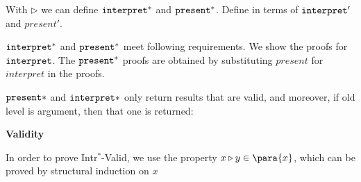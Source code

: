 With $\triangleright$ we can define ${\tt interpret}^*$ and ${\tt present}^*$. Define in terms of ${\tt interpret}'$ and $present'$. 


${\tt interpret}^*$ and ${\tt present}^*$ meet following requirements. We show the proofs for ${\tt interpret}$. The ${\tt present}^*$ proofs are obtained by substituting $present$ for $interpret$ in the proofs.

${\tt present}*$ and ${\tt interpret}*$ only return results that are valid, and moreover, if old level is argument, then that one is returned: 




\bigskip
{\bf Validity}

In order to prove {\sc Intr$^*$-Valid}, we use the property $x \triangleright y \in \para{x}$, which can be proved by structural induction on $x$

